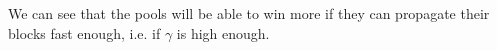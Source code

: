 \begin{figure}[h]
\centering

 \newline

\vspace{1cm}

 \newline
\end{figure}

\begin{figure}[h]
\centering
{} \newline
\end{figure}
\medskip

\clearpage
We can see that the pools will be able to win more if they can propagate their blocks fast enough, i.e. if $\gamma$ is high enough.

